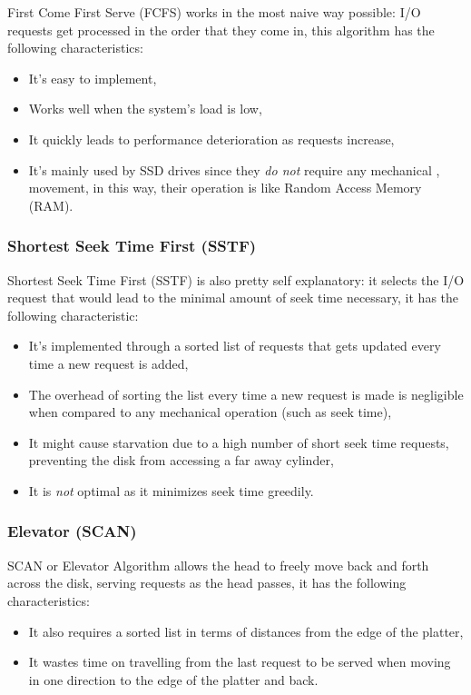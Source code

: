 \documentclass[openright, twoside]{report}
\theoremstyle{definition}
\theoremstyle{example}
\begin{document}
First Come First Serve (FCFS) works in the most naive way possible: I/O requests get 
processed in the order that they come in, this algorithm has the following characteristics:

\begin{itemize}
	\item It's easy to implement,
	\item Works well when the system's load is low,
	\item It quickly leads to performance deterioration as requests increase,
	\item It's mainly used by SSD drives since they \emph{do not} require any mechanical ,
	movement, in this way, their operation is like Random Access Memory (RAM).
\end{itemize}

\subsubsection{Shortest Seek Time First (SSTF)}

Shortest Seek Time First (SSTF) is also pretty self explanatory: it selects the I/O request 
that would lead to the minimal amount of seek time necessary, it has the following 
characteristic:

\begin{itemize}
	\item It's implemented through a sorted list of requests that gets updated every 
	time a new request is added,
	\item The overhead of sorting the list every time a new request is made is negligible 
	when compared to any mechanical operation (such as seek time),
	\item It might cause starvation due to a high number of short seek time requests,
	preventing the disk from accessing a far away cylinder,
	\item It is \emph{not} optimal as it minimizes seek time greedily.
\end{itemize}

\subsubsection{Elevator (SCAN)}

SCAN or Elevator Algorithm allows the head to freely move back and forth across the disk, 
serving requests as the head passes, it has the following characteristics: 

\begin{itemize}
	\item It also requires a sorted list in terms of distances from the edge of the platter,
	\item It wastes time on travelling from the last request to be served when moving in one 
	direction to the edge of the platter and back.
\end{itemize}
\end{document}
